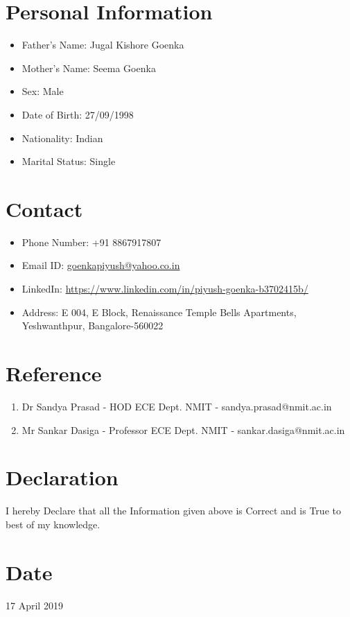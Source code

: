 \documentclass[12pt,a4paper,sans]{moderncv} %
\begin{document}
\section{Personal Information}

\begin{itemize}
	 

\item Father's Name: Jugal Kishore Goenka
\item Mother's Name: Seema Goenka
\item Sex: Male
\item Date of Birth: 27/09/1998
\item Nationality: Indian
\item Marital Status: Single
\end{itemize}


\section{Contact}
\begin{itemize}
	\item Phone Number: +91 8867917807
	\item Email ID: \url{goenkapiyush@yahoo.co.in}
	\item LinkedIn: \url{https://www.linkedin.com/in/piyush-goenka-b3702415b/}
	\item Address: E 004, E Block, Renaissance Temple Bells Apartments, Yeshwanthpur, Bangalore-560022

\end{itemize}


\section{Reference}
\begin{enumerate}
	\item Dr Sandya Prasad - HOD ECE Dept. NMIT - sandya.prasad@nmit.ac.in
	\item Mr Sankar Dasiga - Professor ECE Dept. NMIT - sankar.dasiga@nmit.ac.in

\end{enumerate}
\section{Declaration}
I hereby Declare that all the Information given above is Correct and is True to best of my knowledge.



\section{Date}
17 April 2019
\end{document}
